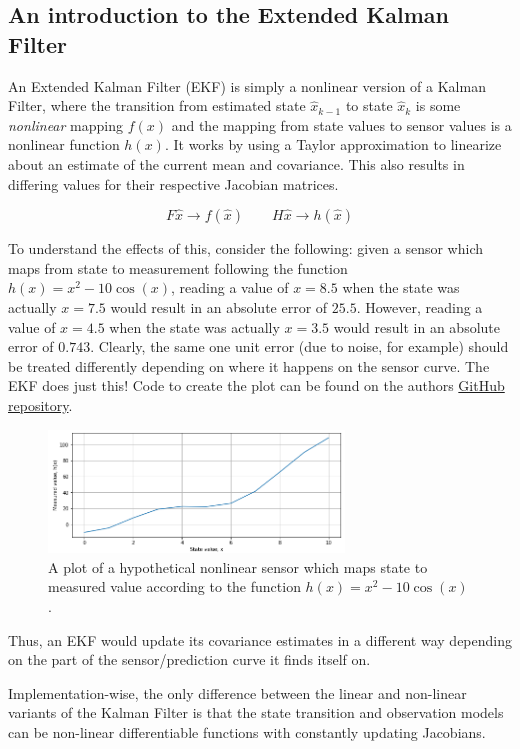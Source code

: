 \subsection{An introduction to the Extended Kalman Filter}
An Extended Kalman Filter (EKF) is simply a nonlinear version of a Kalman Filter, where the transition from estimated state $\hat{x}_{k-1}$ to state $\hat{x}_k$ is some \emph{nonlinear} mapping $f(x)$ and the mapping from state values to sensor values is a nonlinear function $h(x)$. It works by using a Taylor approximation to linearize about an estimate of the current mean and covariance. This also results in differing values for their respective Jacobian matrices.

\[ F \hat{x} \rightarrow f(\hat{x}) \qquad H \hat{x} \rightarrow h(\hat{x}) \]

To understand the effects of this, consider the following: given a sensor which maps from state to measurement following the function $h(x) = x^2 - 10\cos{(x)}$, reading a value of $x = 8.5$ when the state was actually $x=7.5$ would result in an absolute error of $25.5$. However, reading a value of $x=4.5$ when the state was actually $x=3.5$ would result in an absolute error of $0.743$. Clearly, the same one unit error (due to noise, for example) should be treated differently depending on where it happens on the sensor curve. The EKF does just this! Code to create the plot can be found on the authors \href{https://github.com/alknemeyer/EEE4022S-Thesis-Project/blob/master/Final%20code/Illustrations%20for%20report.ipynb}{GitHub repository}.

\begin{figure}[h!]
  \centering
  \includegraphics[width=0.7\textwidth]{literature_review/EKF_nonlinear_sensor}
  \caption{\label{fig:EKF_nonlinear_sensor}A plot of a hypothetical nonlinear sensor which maps state to measured value according to the function $h(x) = x^2 - 10\cos{(x)}$.}
\end{figure}

Thus, an EKF would update its covariance estimates in a different way depending on the part of the sensor/prediction curve it finds itself on.

Implementation-wise, the only difference between the linear and non-linear variants of the Kalman Filter is that the state transition and observation models can be non-linear differentiable functions with constantly updating Jacobians.

